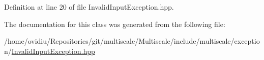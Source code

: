 Definition at line 20 of file Invalid\-Input\-Exception.\-hpp.



The documentation for this class was generated from the following file\-:\begin{DoxyCompactItemize}
\item 
/home/ovidiu/\-Repositories/git/multiscale/\-Multiscale/include/multiscale/exception/\hyperlink{InvalidInputException_8hpp}{Invalid\-Input\-Exception.\-hpp}\end{DoxyCompactItemize}
